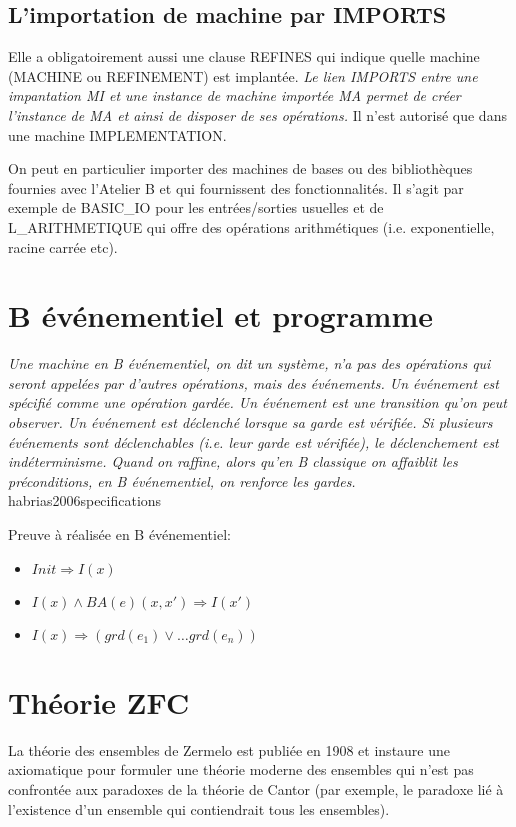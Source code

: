 \documentclass[10pt,a4paper]{article}
\begin{document}
\subsection{L'importation de machine par IMPORTS}

Elle a obligatoirement aussi une clause REFINES qui indique quelle machine (MACHINE
ou REFINEMENT) est implantée. \emph{Le lien IMPORTS entre une impantation MI et une instance de machine importée MA permet de créer l’instance de MA et ainsi de disposer de ses opérations.\cite{habrias2006specifications}}
Il n'est autorisé que dans une machine IMPLEMENTATION.

On peut en particulier importer des machines de bases ou des bibliothèques fournies avec l’Atelier B et qui fournissent des fonctionnalités. Il s'agit par exemple de BASIC\_IO pour les entrées/sorties usuelles et de L\_ARITHMETIQUE qui offre des opérations arithmétiques (i.e. exponentielle, racine carrée etc).

\section{B événementiel et programme}

\emph{Une machine en B  événementiel, on dit un système, n’a pas des opérations qui seront appelées par d’autres opérations, mais des  événements. Un  événement est spécifié comme une opération gardée. Un événement  est une transition qu’on peut observer.\newline
\indent Un  événement est déclenché lorsque sa garde est vérifiée. Si plusieurs événements sont déclenchables (i.e. leur garde est vérifiée), le déclenchement est indéterminisme. \newline
\indent Quand on raffine, alors qu’en B classique on affaiblit les préconditions, en B événementiel, on renforce les gardes. 
}habrias2006specifications

Preuve à réalisée en B événementiel:
\begin{itemize}
\item $Init \Rightarrow I(x)$
\item $ I(x) \wedge BA(e)(x, x') \Rightarrow I(x')$
\item $ I(x) \Rightarrow \left( grd(e_1) \vee \ldots grd(e_n) \right)$
\end{itemize}


\appendix

\section{Théorie ZFC}
\label{ZFC}
La théorie des ensembles de Zermelo est publiée en 1908 et instaure une axiomatique pour formuler une théorie moderne des ensembles qui n'est pas confrontée aux paradoxes de la théorie de Cantor (par exemple, le paradoxe lié à l'existence d'un ensemble qui contiendrait tous les ensembles).
\end{document}
